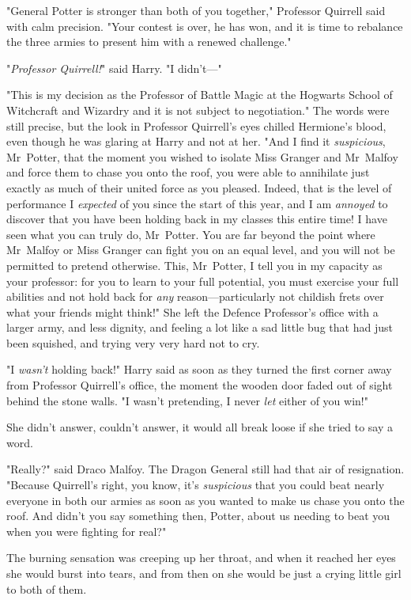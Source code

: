 "General Potter is stronger than both of you together," Professor Quirrell said
with calm precision. "Your contest is over, he has won, and it is time to
rebalance the three armies to present him with a renewed challenge."

"\emph{Professor Quirrell!}" said Harry. "I didn't---"

"This is my decision as the Professor of Battle Magic at the Hogwarts School of
Witchcraft and Wizardry and it is not subject to negotiation." The words were
still precise, but the look in Professor Quirrell's eyes chilled Hermione's
blood, even though he was glaring at Harry and not at her. "And I find it
\emph{suspicious}, Mr~Potter, that the moment you wished to isolate Miss
Granger and Mr~Malfoy and force them to chase you onto the roof, you were able
to annihilate just exactly as much of their united force as you pleased.
Indeed, that is the level of performance I \emph{expected} of you since the
start of this year, and I am \emph{annoyed} to discover that you have been
holding back in my classes this entire time! I have seen what you can truly do,
Mr~Potter. You are far beyond the point where Mr~Malfoy or Miss Granger can
fight you on an equal level, and you will not be permitted to pretend
otherwise. This, Mr~Potter, I tell you in my capacity as your professor: for
you to learn to your full potential, you must exercise your full abilities and
not hold back for \emph{any} reason---particularly not childish frets over what
your friends might think!"
\later
She left the Defence Professor's office with a larger army, and less dignity,
and feeling a lot like a sad little bug that had just been squished, and trying
very very hard not to cry.

"I \emph{wasn't} holding back!" Harry said as soon as they turned the first
corner away from Professor Quirrell's office, the moment the wooden door faded
out of sight behind the stone walls. "I wasn't pretending, I never \emph{let}
either of you win!"

She didn't answer, couldn't answer, it would all break loose if she tried to
say a word.

"Really?" said Draco Malfoy. The Dragon General still had that air of
resignation. "Because Quirrell's right, you know, it's \emph{suspicious} that
you could beat nearly everyone in both our armies as soon as you wanted to make
us chase you onto the roof. And didn't you say something then, Potter, about us
needing to beat you when you were fighting for real?"

The burning sensation was creeping up her throat, and when it reached her eyes
she would burst into tears, and from then on she would be just a crying little
girl to both of them.

